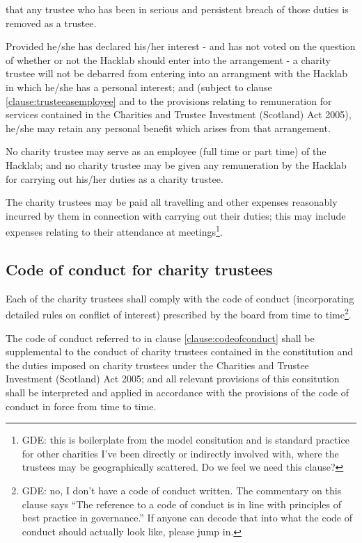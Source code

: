 \documentclass{article}
\begin{document}
\subclause that any trustee who has been in serious and persistent
breach of those duties is removed as a trustee.

\clause Provided he/she has declared his/her interest - and has not
voted on the question of whether or not the Hacklab should enter into
the arrangement - a charity trustee will not be debarred from entering
into an arrangment with the Hacklab in which he/she has a personal
interest; and (subject to clause \ref{clause:trusteeasemployee} and to
the provisions relating to remuneration for services contained in the
Charities and Trustee Investment (Scotland) Act 2005), he/she may
retain any personal benefit which arises from that arrangement.

\clause\label{clause:trusteeasemployee}No charity trustee may serve as
an employee (full time or part time) of the Hacklab; and no
charity trustee may be given any remuneration by the Hacklab for
carrying out his/her duties as a charity trustee.

\clause The charity trustees may be paid all travelling and other
expenses reasonably incurred by them in connection with carrying out
their duties; this may include expenses relating to their attendance
at meetings\footnote{GDE: this is boilerplate from the model
  consitution and is standard practice for other charities I've been
  directly or indirectly involved with, where the trustees may be
  geographically scattered. Do we feel we need this clause?}.

\subsection{Code of conduct for charity trustees}

\clause Each of the charity trustees shall comply with the code of
conduct (incorporating detailed rules on conflict of interest)
prescribed by the board from time to time\footnote{GDE: no, I don't
  have a code of conduct written. The commentary on this clause says
  ``The reference to a code of conduct is in line with principles of
  best practice in governance.'' If anyone can decode that into what
  the code of conduct should actually look like, please jump in.}.

\clause The code of conduct referred to in clause
\ref{clause:codeofconduct} shall be supplemental to the conduct of
charity trustees contained in the constitution and the duties imposed
on charity trustees under the Charities and Trustee Investment
(Scotland) Act 2005; and all relevant provisions of this consitution
shall be interpreted and applied in accordance with the provisions of
the code of conduct in force from time to time.
\end{document}

